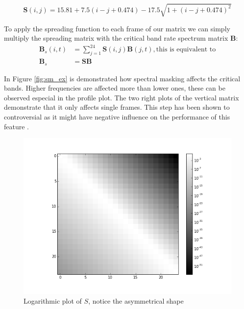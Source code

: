 \documentclass[cic,tc,english]{iiufrgs}
\begin{document}
\begin{enumerate}
\begin{equation}
\mathbf{S}(i,j) = 15.81 + 7.5(i-j + 0.474) - 17.5 \sqrt{1+(i-j+0.474)^2}
\end{equation}

To apply the spreading function to each frame of our matrix we can simply multiply the spreading matrix with the critical band rate spectrum matrix $\mathbf{B}$:
\begin{equation}
\begin{split}
\mathbf{B}_s(i,t) &= \sum_{j=1}^{24} \mathbf{S}(i,j) \mathbf{B}(j,t), \text{this is equivalent to} \\
\mathbf{B}_s &= \mathbf{S} \mathbf{B}
\end{split}
\end{equation}

In Figure \ref{fig:sm_ex} is demonstrated how spectral masking affects the critical bands. Higher frequencies are affected more than lower ones, these can be observed especial in the profile plot. The two right plots of the vertical matrix demonstrate that it only affects single frames. This step has been shown to controversial as it might have negative influence on the performance of this feature \cite{lidy2005evaluation}.


\begin{figure}
    \caption{Logarithmic plot of $S$, notice the asymmetrical shape}
    \begin{center}
        \includegraphics[width=\linewidth]{masking}
    \end{center}
    \label{fig:spreading_func}
\end{figure}


\end{enumerate}
\end{document}
